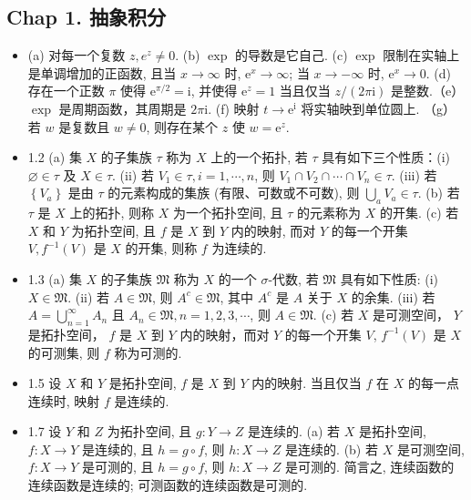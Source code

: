 
\subsection{Chap 1. 抽象积分}
\begin{itemize}
\item (a) 对每一个复数 $z, e^{z} \neq 0$. (b) $\exp$ 的导数是它自己. (c) $\exp$ 限制在实轴上是单调增加的正函数, 且当 $x \rightarrow \infty$ 时, $\mathrm{e}^{x} \rightarrow \infty$; 当 $x \rightarrow-\infty$ 时, $\mathrm{e}^{x} \rightarrow 0$.
(d) 存在一个正数 $\pi$ 使得 $\mathrm{e}^{\pi / 2}=\mathrm{i}$, 并使得 $\mathrm{e}^{z}=1$ 当且仅当 $z /(2 \pi \mathrm{i})$ 是整数.（e） $\exp$ 是周期函数，其周期是 $2 \pi \mathrm{i}$. (f) 映射 $t \rightarrow \mathrm{e}^{\mathrm{i}}$ 将实轴映到单位圆上. （g）若 $w$ 是复数且 $w \neq 0$, 则存在某个 $z$ 使 $w=\mathrm{e}^{z}$.

\item 1.2 (a) 集 $X$ 的子集族 $\tau$ 称为 $X$ 上的一个拓扑, 若 $\tau$ 具有如下三个性质：(i) $\varnothing \in \tau$ 及 $X \in \tau$. (ii) 若 $V_{1} \in \tau, i=1, \cdots, n$, 则 $V_{1} \cap V_{2} \cap \cdots \cap V_{n} \in \tau$. (iii) 若 $\left\{V_{a}\right\}$ 是由 $\tau$ 的元素构成的集族 (有限、可数或不可数), 则 $\bigcup_{a} V_{a} \in \tau$. (b) 若 $\tau$ 是 $X$ 上的拓扑, 则称 $X$ 为一个拓扑空间, 且 $\tau$ 的元素称为 $X$ 的开集. (c) 若 $X$ 和 $Y$ 为拓扑空间, 且 $f$ 是 $X$ 到 $Y$ 内的映射, 而对 $Y$ 的每一个开集 $V, f^{-1}(V)$ 是 $X$ 的开集, 则称 $f$ 为连续的.

\item 1.3 (a) 集 $X$ 的子集族 $\mathfrak{M}$ 称为 $X$ 的一个 $\sigma$-代数, 若 $\mathfrak{M}$ 具有如下性质: (i) $X \in \mathfrak{M}$. (ii) 若 $A \in \mathfrak{M}$, 则 $A^{c} \in \mathfrak{M}$, 其中 $A^{c}$ 是 $A$ 关于 $X$ 的余集. (iii) 若 $A=\bigcup_{n=1}^{\infty} A_{n}$ 且 $A_{n} \in \mathfrak{M}, n=1,2,3, \cdots$, 则 $A \in \mathfrak{M}$. (c) 若 $X$ 是可测空间， $Y$ 是拓扑空间， $f$ 是 $X$ 到 $Y$ 内的映射，而对 $Y$ 的每一个开集 $V$, $f^{-1}(V)$ 是 $X$ 的可测集, 则 $f$ 称为可测的.

\item 1.5 设 $X$ 和 $Y$ 是拓扑空间, $f$ 是 $X$ 到 $Y$ 内的映射. 当且仅当 $f$ 在 $X$ 的每一点连续时, 映射 $f$ 是连续的.

\item 1.7 设 $Y$ 和 $Z$ 为拓扑空间, 且 $g: Y \rightarrow Z$ 是连续的. (a) 若 $X$ 是拓扑空间, $f: X \rightarrow Y$ 是连续的, 且 $h=g \circ f$, 则 $h: X \rightarrow Z$ 是连续的. (b) 若 $X$ 是可测空间, $f: X \rightarrow Y$ 是可测的, 且 $h=g \circ f$, 则 $h: X \rightarrow Z$ 是可测的. 简言之, 连续函数的连续函数是连续的; 可测函数的连续函数是可测的.


\end{itemize}
